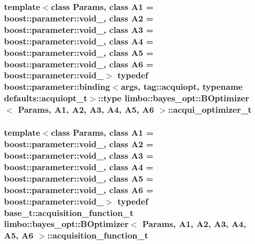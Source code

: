 \subsubsection[{acqui\+\_\+optimizer\+\_\+t}]{\setlength{\rightskip}{0pt plus 5cm}template$<$class Params, class A1 = boost\+::parameter\+::void\+\_\+, class A2 = boost\+::parameter\+::void\+\_\+, class A3 = boost\+::parameter\+::void\+\_\+, class A4 = boost\+::parameter\+::void\+\_\+, class A5 = boost\+::parameter\+::void\+\_\+, class A6 = boost\+::parameter\+::void\+\_\+$>$ typedef boost\+::parameter\+::binding$<${\bf args}, tag\+::acquiopt, typename {\bf defaults\+::acquiopt\+\_\+t}$>$\+::type {\bf limbo\+::bayes\+\_\+opt\+::\+B\+Optimizer}$<$ Params, A1, A2, A3, A4, A5, A6 $>$\+::{\bf acqui\+\_\+optimizer\+\_\+t}}\label{classlimbo_1_1bayes__opt_1_1_b_optimizer_a18dc1b593c859b8f89450a31f80fb592}
\hypertarget{classlimbo_1_1bayes__opt_1_1_b_optimizer_ae0a407a5eba370a6a30acda501cd4ddc}{}
\subsubsection[{acquisition\+\_\+function\+\_\+t}]{\setlength{\rightskip}{0pt plus 5cm}template$<$class Params, class A1 = boost\+::parameter\+::void\+\_\+, class A2 = boost\+::parameter\+::void\+\_\+, class A3 = boost\+::parameter\+::void\+\_\+, class A4 = boost\+::parameter\+::void\+\_\+, class A5 = boost\+::parameter\+::void\+\_\+, class A6 = boost\+::parameter\+::void\+\_\+$>$ typedef {\bf base\+\_\+t\+::acquisition\+\_\+function\+\_\+t} {\bf limbo\+::bayes\+\_\+opt\+::\+B\+Optimizer}$<$ Params, A1, A2, A3, A4, A5, A6 $>$\+::{\bf acquisition\+\_\+function\+\_\+t}}\label{classlimbo_1_1bayes__opt_1_1_b_optimizer_ae0a407a5eba370a6a30acda501cd4ddc}
\hypertarget{classlimbo_1_1bayes__opt_1_1_b_optimizer_afd4c6a7d361de59fac5aa3a332ea0149}{}
